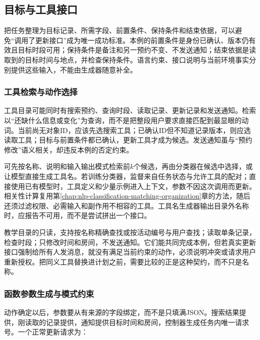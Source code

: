 \subsection{目标与工具接口}
\label{sec:nlp-execution-tools}

把任务整理为目标记录、所需字段、前置条件、保持条件和结束依据，可以避免“调用了更新接口”成为唯一成功标准。本例的前置条件是身份已确认、版本仍有效且目标时段可用；保持条件是备注和另一预约不变、不发送通知；结束依据是读取到的目标时间与地点，并检查保持条件。语言约束、接口说明与当前环境事实分别提供这些输入，不能由生成器随意补全。

\subsubsection{工具检索与动作选择}
\label{sec:nlp-execution-tool-selection}

工具目录可能同时有搜索预约、查询时段、读取记录、更新记录和发送通知。检索以“还缺什么信息或变化”为查询，而不是把整段用户要求直接匹配到最显眼的动词。当前尚无对象ID，应该先选搜索工具；已确认ID但不知道记录版本，则应选读取工具；目标与前置条件都已确认，更新工具才成为候选。发送通知虽与“预约修改”语义相关，却违反本例的否定约束。

可先按名称、说明和输入输出模式检索前$k$个候选，再由分类器在候选中选择，或让模型直接生成工具名。若训练分类器，监督来自任务状态与允许工具的配对；直接使用已有模型时，工具定义和少量示例进入上下文，参数不因这次调用而更新。相关性计算复用第\ref{chap:nlp-classification-matching-organization}章的方法，随后还须过滤权限、必需输入和副作用不相容的工具。工具名生成器输出目录外名称时，应报告不可用，而不是尝试拼出一个接口。

教学目录的只读，支持按名称精确查找或按活动编号与用户查找；读取单条记录，检查时段；只修改时间和房间，不发送通知。它们能共同完成本例，但若真实更新接口强制给所有人发消息，就没有满足当前约束的动作，必须说明冲突或请求用户重新授权。把同义工具替换进计划之前，需要比较的正是这种契约，而不只是名称。

\subsubsection{函数参数生成与模式约束}
\label{sec:nlp-execution-tool-arguments}

动作确定以后，参数要从有来源的字段绑定，而不是只填满JSON。搜索结果提供，刚读取的记录提供，通知提供目标时间和房间，控制器生成任务内唯一请求号。一个正常更新请求为：

